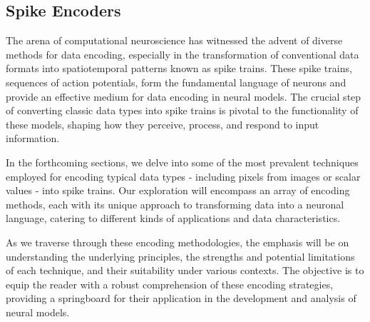 \subsection{Spike Encoders}

The arena of computational neuroscience has witnessed the advent of diverse methods for data encoding, especially in the transformation of conventional data formats into spatiotemporal patterns known as spike trains. These spike trains, sequences of action potentials, form the fundamental language of neurons and provide an effective medium for data encoding in neural models. The crucial step of converting classic data types into spike trains is pivotal to the functionality of these models, shaping how they perceive, process, and respond to input information.

In the forthcoming sections, we delve into some of the most prevalent techniques employed for encoding typical data types - including pixels from images or scalar values - into spike trains. Our exploration will encompass an array of encoding methods, each with its unique approach to transforming data into a neuronal language, catering to different kinds of applications and data characteristics. 

As we traverse through these encoding methodologies, the emphasis will be on understanding the underlying principles, the strengths and potential limitations of each technique, and their suitability under various contexts. The objective is to equip the reader with a robust comprehension of these encoding strategies, providing a springboard for their application in the development and analysis of neural models.






